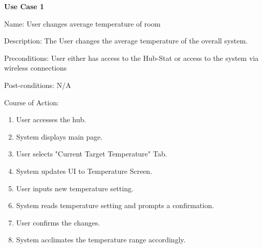 \documentclass{article}
\begin{document}
\begin{flushleft}
\textbf{Use Case 1}

Name: User changes average temperature of room

Description: The User changes the average temperature of the overall system.

Preconditions:
User either has access to the Hub-Stat or access to the system via wireless connections

Post-conditions: N/A

Course of Action:
\end{flushleft}
\begin{enumerate}
    \item User accesses the hub.
    \item System displays main page.
    \item User selects "Current Target Temperature" Tab.
    \item System updates \gls{UI} to Temperature Screen.
    \item User inputs new temperature setting.
    \item System reads temperature setting and prompts a confirmation.
    \item User confirms the changes.
    \item System acclimates the temperature range accordingly.
\end{enumerate}
\end{document}
